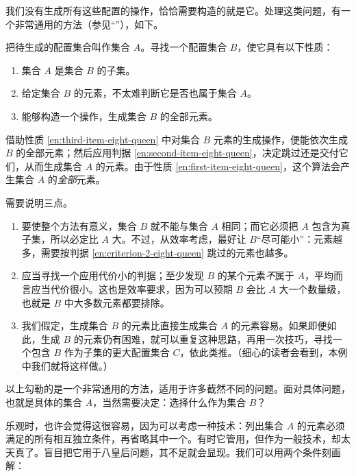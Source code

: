 我们没有生成所有这些配置的操作，恰恰需要构造的就是它。处理这类问题，有一个非常通用的方法（参见“”），如下。

把待生成的配置集合叫作集合 $A$。寻找一个配置集合 $B$，使它具有以下性质：

\begin{enumerate}[wide, nosep, label=(\arabic*)]
	\item \label{en:first-item-eight-queen}
	集合 $A$ 是集合 $B$ 的子集。
	
	\item \label{en:second-item-eight-queen}
	给定集合 $B$ 的元素，不太难判断它是否也属于集合 $A$。
	
	\item \label{en:third-item-eight-queen}
	能够构造一个操作，生成集合 $B$ 的全部元素。
\end{enumerate}

借助性质 \ref{en:third-item-eight-queen} 中对集合 $B$ 元素的生成操作，便能依次生成 $B$ 的全部元素；然后应用判据 \ref{en:second-item-eight-queen}，决定跳过还是交付它们，从而生成集合 $A$ 的元素。由于性质 \ref{en:first-item-eight-queen}，这个算法会产生集合 $A$ 的\textit{全部}元素。

需要说明三点。

\begin{enumerate}[wide, nosep, label=(\arabic*)]
	\item 要使整个方法有意义，集合 $B$ 就不能与集合 $A$ 相同；而它必须把 $A$ 包含为真子集，所以必定比 $A$ 大。不过，从效率考虑，最好让 $B$“尽可能小”：元素越多，需要按判据 \ref{en:criterion-2-eight-queen} 跳过的元素也越多。
	
	\item \label{en:criterion-2-eight-queen}
	应当寻找一个应用代价小的判据；至少发现 $B$ 的某个元素\textit{不}属于 $A$，平均而言应当代价很小。这也是效率要求，因为可以预期 $B$ 会比 $A$ 大一个数量级，也就是 $B$ 中大多数元素都要排除。
	
	\item 我们假定，生成集合 $B$ 的元素比直接生成集合 $A$ 的元素容易。如果即便如此，生成 $B$ 的元素仍有困难，就可以重复这种思路，再用一次技巧，寻找一个包含 $B$ 作为子集的更大配置集合 $C$，依此类推。（细心的读者会看到，本例中我们就将这样做。）
\end{enumerate}

以上勾勒的是一个非常通用的方法，适用于许多截然不同的问题。面对具体问题，也就是具体的集合 $A$，当然需要决定：选择什么作为集合 $B$？

乐观时，也许会觉得这很容易，因为可以考虑一种技术：列出集合 $A$ 的元素必须满足的所有相互独立条件，再省略其中一个。有时它管用，但作为一般技术，却太天真了。盲目把它用于八皇后问题，其不足就会显现。我们可以用两个条件刻画解：

